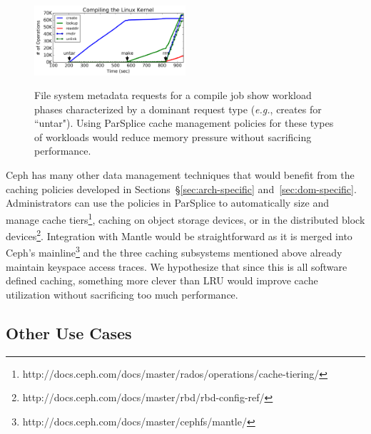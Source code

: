 \begin{figure}[t]
\noindent\includegraphics[width=0.5\textwidth]{figures/compile-ops.png}\\
\caption{File system metadata requests for a compile job show workload phases
characterized by a dominant request type ({\it e.g.}, creates for ``untar").
Using ParSplice cache management policies for these types of workloads would
reduce memory pressure without sacrificing performance.
\label{fig:compile-ops}}
\end{figure}

Ceph has many other data management techniques that would benefit from the
caching policies developed in Sections~\S\ref{sec:arch-specific}
and~\ref{sec:dom-specific}. Administrators can use the policies in ParSplice to
automatically size and manage cache
tiers\footnote{http://docs.ceph.com/docs/master/rados/operations/cache-tiering/},
caching on object storage devices, or in the distributed block
devices\footnote{http://docs.ceph.com/docs/master/rbd/rbd-config-ref/}.
Integration with Mantle would be straightforward as it is merged into Ceph's
mainline\footnote{http://docs.ceph.com/docs/master/cephfs/mantle/} and the
three caching subsystems mentioned above already maintain keyspace access
traces. We hypothesize that since this is all software defined caching,
something more clever than LRU would improve cache utilization without
sacrificing too much performance.

\subsection{Other Use Cases}

